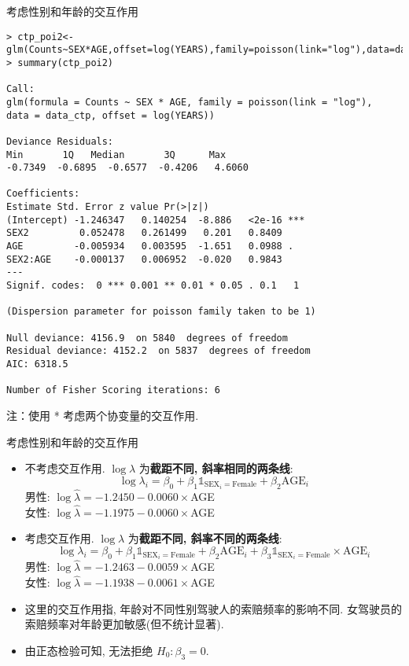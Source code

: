\documentclass[professionalfont]{beamer}
\begin{document}
\begin{frame}[fragile]{考虑性别和年龄的交互作用}
	\begin{lstlisting}
> ctp_poi2<-glm(Counts~SEX*AGE,offset=log(YEARS),family=poisson(link="log"),data=data_ctp)
> summary(ctp_poi2)

Call:
glm(formula = Counts ~ SEX * AGE, family = poisson(link = "log"), 
data = data_ctp, offset = log(YEARS))

Deviance Residuals: 
Min       1Q   Median       3Q      Max  
-0.7349  -0.6895  -0.6577  -0.4206   4.6060  

Coefficients:
Estimate Std. Error z value Pr(>|z|)    
(Intercept) -1.246347   0.140254  -8.886   <2e-16 ***
SEX2         0.052478   0.261499   0.201   0.8409    
AGE         -0.005934   0.003595  -1.651   0.0988 .  
SEX2:AGE    -0.000137   0.006952  -0.020   0.9843    
---
Signif. codes:  0 *** 0.001 ** 0.01 * 0.05 . 0.1   1

(Dispersion parameter for poisson family taken to be 1)

Null deviance: 4156.9  on 5840  degrees of freedom
Residual deviance: 4152.2  on 5837  degrees of freedom
AIC: 6318.5

Number of Fisher Scoring iterations: 6
\end{lstlisting}
注：使用 * 考虑两个协变量的交互作用.
\end{frame}

\begin{frame}{考虑性别和年龄的交互作用}
	\begin{itemize}
		\item 不考虑交互作用. $\log \lambda$ 为\textbf{截距不同, 斜率相同的两条线}:
		\begin{equation}
		\log\lambda_i=\beta_0+\beta_1\mathds{1}_{\text{SEX}_i=\text{Female}}+\beta_2\text{AGE}_i
		\end{equation}
		男性: $\log \hat{\lambda}=-1.2450-0.0060\times$AGE\\
		女性: $\log \hat{\lambda}=-1.1975-0.0060\times$AGE\\
		
		\item 考虑交互作用. $\log \lambda$ 为\textbf{截距不同, 斜率不同的两条线}:
		\begin{equation}
		\log\lambda_i=\beta_0+\beta_1\mathds{1}_{\text{SEX}_i=\text{Female}}+\beta_2\text{AGE}_i+\beta_3\mathds{1}_{\text{SEX}_i=\text{Female}}\times\text{AGE}_i
		\end{equation}
		男性: $\log \hat{\lambda}=-1.2463-0.0059\times$AGE\\
		女性: $\log \hat{\lambda}=-1.1938-0.0061\times$AGE\\
		\item 这里的交互作用指, 年龄对不同性别驾驶人的索赔频率的影响不同. 女驾驶员的索赔频率对年龄更加敏感(但不统计显著).
		\item 由正态检验可知, 无法拒绝 $H_0: \beta_3=0$. 
	\end{itemize}
\end{frame}
\end{document}
